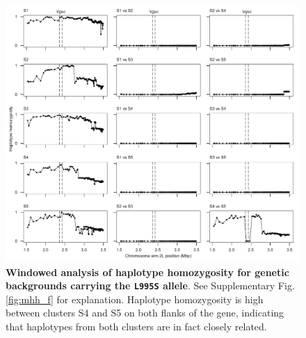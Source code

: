 \documentclass[a4paper,11pt,abstracton,hidelinks]{scrartcl}
\begin{document}
%
\begin{figure}[!b]
  \includegraphics[width=1.1\linewidth,center]{artwork/mhh_S.pdf}
  \caption{\textbf{Windowed analysis of haplotype homozygosity for genetic backgrounds carrying the \texttt{L995S} allele}. See Supplementary Fig. \ref{fig:mhh_f} for explanation. Haplotype homozygosity is high between clusters S4 and S5 on both flanks of the gene, indicating that haplotypes from both clusters are in fact closely related.}
  \label{fig:mhh_s}
\end{figure}


\clearpage
\end{document}
